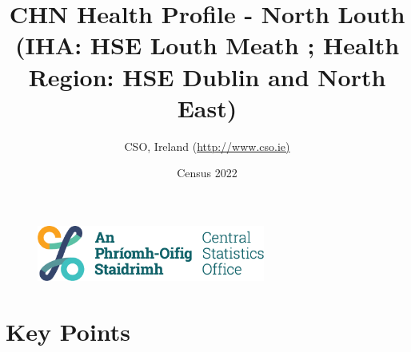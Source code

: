 \documentclass{article}
\title{CHN Health Profile - North Louth (IHA: HSE Louth Meath ;  Health Region: HSE Dublin and North East) }
\date{Census 2022}
\author{CSO, Ireland  (\url{http://www.cso.ie)}}
\begin{document}


\begin{figure}
	\centering
\includegraphics[width =75mm]{../figures/CSO_Logo.png}
\end{figure}

				 
		   
						  
														  
																																													
												 
			 
\maketitle
					
													   
				 
						 
																																																																											   
				 
				  
  \pagebreak
    	    \tableofcontents

\pagebreak


\section{Key Points}
\end{document}
